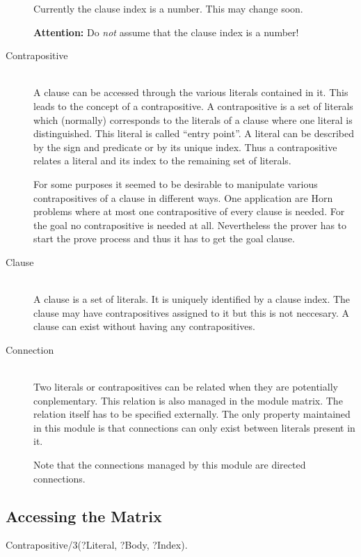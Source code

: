 \begin{description}
  Currently the clause index is a number. This may change soon.

  {\large\bf Attention:} Do {\em not}\/ assume that the clause index is a
  number!

\item[Contrapositive]\ \\
  A clause can be accessed through the various literals contained in it. This
  leads to the concept of a contrapositive. A contrapositive is a set of
  literals which (normally) corresponds to the literals of a clause where one
  literal is distinguished. This literal is called ``entry point''. A literal
  can be described by the sign and predicate or by its unique index. Thus a
  contrapositive relates a literal and its index to the remaining set of
  literals.

  For some purposes it seemed to be desirable to manipulate various
  contrapositives of a clause in different ways. One application are Horn
  problems where at most one contrapositive of every clause is needed. For the
  goal no contrapositive is needed at all. Nevertheless the prover has to
  start the prove process and thus it has to get the goal clause.

\item[Clause]\ \\
  A clause is a set of literals. It is uniquely identified by a clause
  index. The clause may have contrapositives assigned to it but this is not
  neccesary. A clause can exist without having any contrapositives.

\item[Connection]\ \\
  Two literals or contrapositives can be related when they are potentially
  conplementary. This relation is also managed in the module {\sf matrix}. The
  relation itself has to be specified externally. The only property maintained
  in this module is that connections can only exist between literals present
  in it.

  Note that the connections managed by this module are directed connections.
\end{description}



\subsection{Accessing the Matrix}

\Predicate Contrapositive/3(?Literal, ?Body, ?Index).

